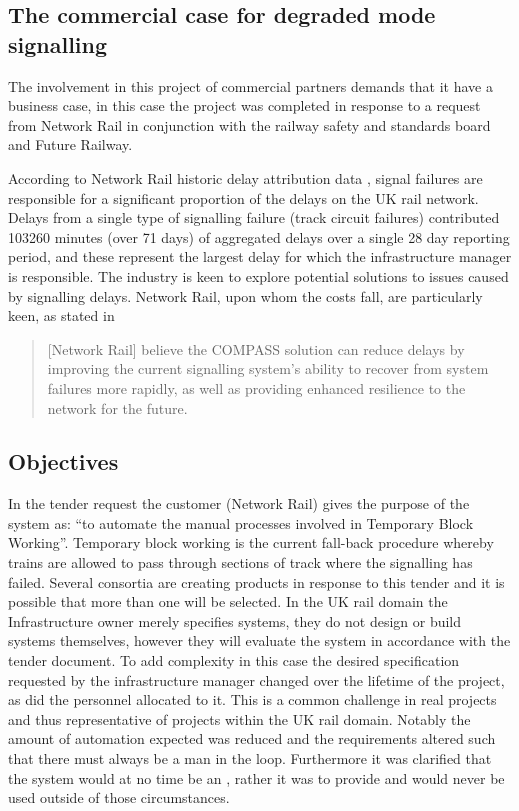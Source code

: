 \subsection{The commercial case for degraded mode signalling}
The involvement in this project of commercial partners demands that it have a business case, in this case the project was completed in response to a request from Network Rail in conjunction with the railway safety and standards board and Future Railway. 

According to Network Rail historic delay attribution data  \citep{NetworkRailInfrastructureLtd2017}, signal failures are responsible for a significant proportion of the delays on the UK rail network. Delays from a single type of signalling failure (track circuit failures) contributed 103260 minutes (over 71 days) of aggregated delays over a single 28 day reporting period, and these represent the largest delay for which the infrastructure manager is responsible. The industry is keen to explore potential solutions to issues caused by signalling delays. Network Rail, upon whom the costs fall, are particularly keen, as stated in \citet{MagazineRailTechnology2015} 
\begin{quote}
    [Network Rail] believe the COMPASS solution can reduce delays by improving the current signalling system’s ability to recover from system failures more rapidly, as well as providing enhanced resilience to the network for the future. 
\end{quote}

\subsection{Objectives}
\label{sec:objectivescompass}
In the tender request the customer (Network Rail) gives the purpose of the system as: ``to automate the manual processes involved in Temporary Block Working''. Temporary block working is the current fall-back procedure whereby trains are allowed to pass through sections of track where the signalling has failed. Several consortia are creating products in response to this tender and it is possible that more than one will be selected. In the UK rail domain the Infrastructure owner merely specifies systems, they do not design or build systems themselves, however they will evaluate the system in accordance with the tender document. To add complexity in this case the desired specification requested by the infrastructure manager changed over the lifetime of the project, as did the personnel allocated to it. This is a common challenge in real projects and thus representative of projects within the UK rail domain. Notably the amount of automation expected was reduced and the requirements altered such that there must always be a man in the loop. Furthermore it was clarified that the system would at no time be an , rather it was to provide  and would never be used outside of those circumstances. 

